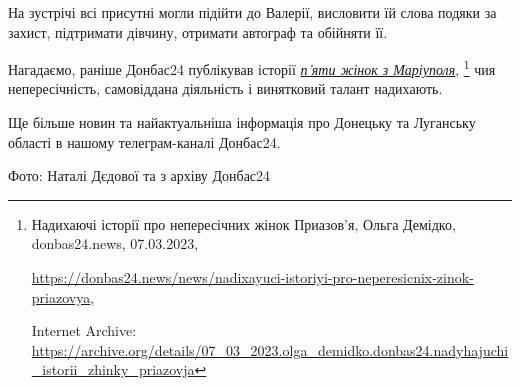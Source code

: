 
На зустрічі всі присутні могли підійти до Валерії, висловити їй слова подяки за
захист, підтримати дівчину, отримати автограф та обійняти її.


Нагадаємо, раніше Донбас24 публікував історії \href{https://archive.org/details/07_03_2023.olga_demidko.donbas24.nadyhajuchi_istorii_zhinky_priazovja}{\emph{п'яти жінок з Маріуполя}},
\footnote{Надихаючі історії про непересічних жінок Приазов'я, Ольга Демідко, donbas24.news, 07.03.2023, %
\par\url{https://donbas24.news/news/nadixayuci-istoriyi-pro-neperesicnix-zinok-priazovya}, \par%
Internet Archive: \url{https://archive.org/details/07_03_2023.olga_demidko.donbas24.nadyhajuchi_istorii_zhinky_priazovja}%
} чия непересічність, самовіддана діяльність і винятковий талант надихають.

Ще більше новин та найактуальніша інформація про Донецьку та Луганську області
в нашому телеграм-каналі Донбас24.

Фото: Наталі Дєдової та з архіву Донбас24

